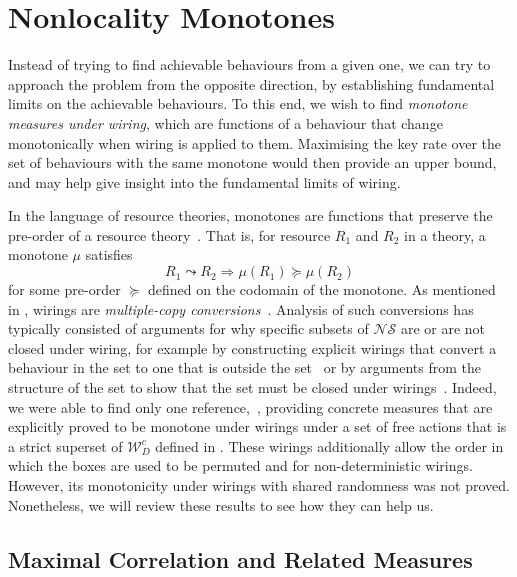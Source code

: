 \documentclass[10pt, a4paper]{article}
\numberwithin{equation}{section} %
\theoremstyle{definition}
\theoremstyle{plain}
\newcommand{\?}{\mathrel{?}} %
\newcommand{\sW}{\mathcal{W}}
\newcommand{\NSs}{\mathcal{NS}}
\begin{document}
    \section{Nonlocality Monotones}\label{sec:nlmono}

    Instead of trying to find achievable behaviours from a given one, we can try to approach the problem from the opposite direction, by establishing fundamental limits on the achievable behaviours. To this end, we wish to find \emph{monotone measures under wiring}, which are functions of a behaviour that change monotonically when wiring is applied to them. Maximising the key rate over the set of behaviours with the same monotone would then provide an upper bound, and may help give insight into the fundamental limits of wiring.

    In the language of resource theories, monotones are functions that preserve the pre-order of a resource theory~\cite{BellResourceTheory}. That is, for resource \(R_1\) and \(R_2\) in a theory, a monotone \(\mu\) satisfies
    \begin{equation}
      R_1 \leadsto R_2 \Rightarrow \mu(R_1) \succeq \mu(R_2)
    \end{equation}
    for some pre-order \(\succeq\) defined on the codomain of the monotone. As mentioned in , wirings are \emph{multiple-copy conversions}~\cite{BellResourceTheory}. Analysis of such conversions has typically consisted of arguments for why specific subsets of \(\NSs\) are or are not closed under wiring, for example by constructing explicit wirings that convert a behaviour in the set to one that is outside the set~\cite{ClosedCorrSets} or by arguments from the structure of the set to show that the set must be closed under wirings~\cite{NonlocalZoo}. Indeed, we were able to find only one reference,~\cite{NLMonotones}, providing concrete measures that are explicitly proved to be monotone under wirings under a set of free actions that is a strict superset of \(\sW_D^c\) defined in . These wirings additionally allow the order in which the boxes are used to be permuted and for non-deterministic wirings. However, its monotonicity under wirings with shared randomness was not proved. Nonetheless, we will review these results to see how they can help us.

    \subsection{Maximal Correlation and Related Measures}\label{sec:nlmono_maxcorr}
\end{document}
